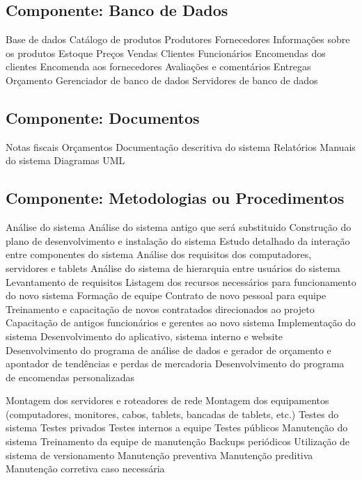      \subsection{Componente: Banco de Dados}
	\begin{outline}
	\1 Base de dados
		\2 Catálogo de produtos
		\2 Produtores
		\2 Fornecedores
		\2 Informações sobre os produtos
		\2 Estoque
		\2 Preços
		\2 Vendas
		\2 Clientes
		\2 Funcionários 
		\2 Encomendas dos clientes
		\2 Encomenda aos fornecedores
		\2 Avaliações e comentários
		\2 Entregas
		\2 Orçamento
	\1 Gerenciador de banco de dados
	\1 Servidores de banco de dados
	\end{outline}
     \subsection{Componente: Documentos }
	\begin{outline}
	\1 Notas fiscais
	\1 Orçamentos
	\1 Documentação descritiva do sistema
	\1 Relatórios
	\1 Manuais do sistema  
	\1 Diagramas UML
	\end{outline}
     \subsection{Componente: Metodologias ou Procedimentos}
	\begin{outline}
	\1 An\'{a}lise do sistema
		\2 An\'{a}lise do sistema antigo que será substituido
		\2 Construção do plano de desenvolvimento e instalação do sistema
		\2 Estudo detalhado da interação entre componentes do sistema
		\2 An\'{a}lise dos requisitos dos computadores, servidores e tablets
		\2 An\'{a}lise do sistema de hierarquia entre usuários do sistema
	\1 Levantamento de requisitos
		\2 Listagem dos recursos necessários para funcionamento do novo sistema
	\1 Formação de equipe
		\2 Contrato de novo pessoal para equipe 
		\2 Treinamento e capacitação de novos contratados direcionados ao projeto
		\2 Capacitação de antigos funcionários e gerentes ao novo sistema
	\1 Implementação do sistema
		\2 Desenvolvimento do aplicativo, sistema interno e website
		\2 Desenvolvimento do programa de análise de dados e gerador de orçamento e apontador de tendências e perdas de mercadoria
		\2 Desenvolvimento do programa de encomendas personalizadas
		
		\2 Montagem dos servidores e roteadores de rede
		\2 Montagem dos equipamentos (computadores, monitores, cabos, tablets, bancadas de tablets, etc.)
	\1 Testes do sistema
		\2 Testes privados
		\2 Testes internos a equipe
		\2 Testes públicos
	\1 Manutenção do sistema
		\2 Treinamento da equipe de manutenção
		\2 Backups periódicos 
		\2 Utilização de sistema de versionamento
		\2 Manutenção preventiva
		\2 Manutenção preditiva
		\2 Manutenção corretiva caso necessária
	\end{outline}
